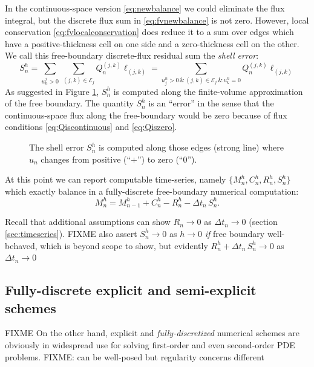 \documentclass[final,leqno,onefignum,onetabnum]{siamltex1213bueler}
\begin{document}
In the continuous-space version \eqref{eq:newbalance} we could eliminate the flux integral, but the discrete flux sum in \eqref{eq:fvnewbalance} is not zero.  However, local conservation \eqref{eq:fvlocalconservation} does reduce it to a sum over edges which have a positive-thickness cell on one side and a zero-thickness cell on the other.  We call this free-boundary discrete-flux residual sum the \emph{shell error}:
\begin{equation}
S_n^h = \sum_{u_n^j>0}\, \sum_{(j,k)\in\mathcal{E}_j} Q_n^{(j,k)} \ell_{(j,k)} = \sum_{u_j^n > 0 \,\&\, (j,k)\in\mathcal{E}_j \,\&\, u_k^n = 0} Q_n^{(j,k)} \ell_{(j,k)} \label{eq:fvderiveshellerror}
\end{equation}
As suggested in Figure \ref{fig:fvmesh-shellerror}, $S_n^h$ is computed along the finite-volume approximation of the free boundary.  The quantity $S_n^h$ is an ``error'' in the sense that the continuous-space flux along the free-boundary would be zero because of flux conditions \eqref{eq:Qiscontinuous} and \eqref{eq:Qiszero}.

\begin{figure}[ht]
\begin{center}

\end{center}
\caption{The shell error $S_n^h$ is computed along those edges (strong line) where $u_n$ changes from positive (``$+$'') to zero (``$0$'').}
\label{fig:fvmesh-shellerror}
\end{figure}

At this point we can report computable time-series, namely $\{M_n^h,C_n^h,R_n^h,S_n^h\}$ which exactly balance in a fully-discrete free-boundary numerical computation:
\begin{equation}
  M_n^h = M_{n-1}^h + C_n^h - R_n^h - \Delta t_n\,S_n^h. \label{eq:fvfinalbalance}
\end{equation}

Recall that additional assumptions can show $R_n\to 0$ as $\Delta t_n\to 0$ (section \ref{sec:timeseries}).  FIXME also assert $S_n^h\to 0$ as $h\to 0$ \emph{if} free boundary well-behaved, which is beyond scope to show, but evidently $R_n^h + \Delta t_n\,S_n^h \to 0$ as $\Delta t_n\to 0$

\subsection{Fully-discrete explicit and semi-explicit schemes} \label{subsec:spaceexplicit}
FIXME  On the other hand, explicit and \emph{fully-discretized} numerical schemes are obviously in widespread use for solving first-order and even second-order PDE problems.  FIXME:  can be well-posed but regularity concerns different
\end{document}
